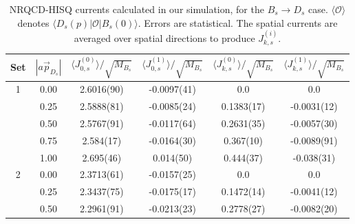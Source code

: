 \documentclass[a4paper,10pt]{article}
\numberwithin{equation}{section}
\begin{document}
\begin{table}
\begin{center}
\begin{tabular}{ c c c c c c }
\hline
Set & $| a\vec{p}_{D_s} |$ & $\langle J_{0,s}^{(0)} \rangle / \sqrt{M_{B_s}}$& $\langle J_{0,s}^{(1)} \rangle / \sqrt{M_{B_s}}$& $\langle J_{k,s}^{(0)} \rangle / \sqrt{M_{B_s}}$& $\langle J_{k,s}^{(1)} \rangle / \sqrt{M_{B_s}}$\\ [0.5ex]
\hline
1 & 0.00 & 2.6016(90) & -0.0097(41) & 0.0 & 0.0 \\ [0.5ex] 
 & 0.25 & 2.5888(81) & -0.0085(24) & 0.1383(17) & -0.0031(12)\\ [0.5ex] 
 & 0.50 & 2.5767(91) & -0.0117(64) & 0.2631(35) & -0.0057(30)\\ [0.5ex] 
 & 0.75 & 2.584(17) & -0.0164(30) & 0.367(10) & -0.0089(91)\\ [0.5ex] 
 & 1.00 & 2.695(46) & 0.014(50) & 0.444(37) & -0.038(31)\\ [0.5ex]
 \hline 
2 & 0.00 & 2.3713(61) & -0.0157(25) & 0.0 & 0.0 \\ [0.5ex] 
 & 0.25 & 2.3437(75) & -0.0175(17) & 0.1472(14) & -0.0041(12)\\ [0.5ex] 
 & 0.50 & 2.2961(91) & -0.0213(23) & 0.2778(27) & -0.0082(20)\\ [0.5ex] 
\hline
\end{tabular}
\caption{NRQCD-HISQ currents calculated in our simulation, for the $B_s\to D_s$ case. $\langle\mathcal{O} \rangle$ denotes $\langle D_s(p) |\mathcal{O}| B_s(0) \rangle$. Errors are statistical. The spatial currents are averaged
over spatial directions to produce $J_{k,s}^{(i)}$. \label{table:fitresults2}}
\end{center}
\end{table}
\end{document}
